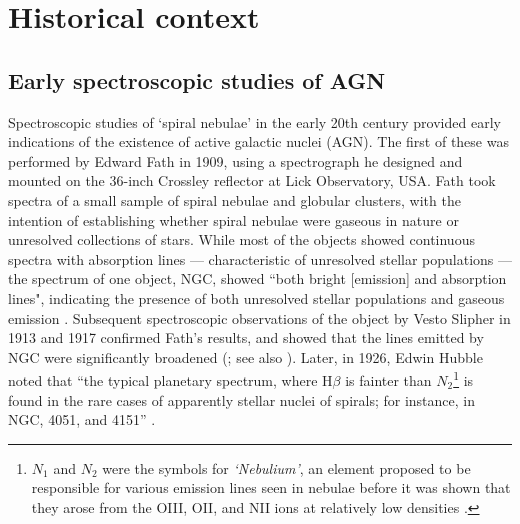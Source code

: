 \section{Historical context}
\label{section: introduction: historical_context}

\subsection{Early spectroscopic studies of AGN}
\label{section: introduction: historical_context: early_studies}

Spectroscopic studies of `spiral nebulae' in the early 20th century provided early indications of the existence of active galactic nuclei (AGN). The first of these was performed by Edward Fath in 1909, using a spectrograph he designed and mounted on the 36-inch Crossley reflector at Lick Observatory, USA. Fath took spectra of a small sample of spiral nebulae and globular clusters, with the intention of establishing whether spiral nebulae were gaseous in nature or unresolved collections of stars. While most of the objects showed continuous spectra with absorption lines --- characteristic of unresolved stellar populations --- the spectrum of one object, NGC, showed ``both bright [emission] and absorption lines", indicating the presence of both unresolved stellar populations and gaseous emission \citep{Fath1909}. Subsequent spectroscopic observations of the object by Vesto Slipher in 1913 and 1917 confirmed Fath's results, and showed that the lines emitted by NGC were significantly broadened (\citealt{Slipher1917}; see also \citealt{Campbell1918}). Later, in 1926, Edwin Hubble noted that ``the typical planetary spectrum, where H$\beta$ is fainter than $N_2$\footnote{$N_1$ and $N_2$ were the symbols for \textit{`Nebulium'}, an element proposed to be responsible for various emission lines seen in nebulae before it was shown that they arose from the OIII, OII, and NII ions at relatively low densities \citep{Bowen1927}.} is found in the rare cases of apparently stellar nuclei of spirals; for instance, in NGC, 4051, and 4151'' \citep{Hubble1926}. 

